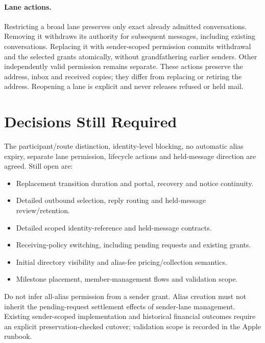 \documentclass[11pt]{article}
\begin{document}
\paragraph{Lane actions.}
Restricting a broad lane preserves only exact already admitted conversations.
Removing it withdraws its authority for subsequent messages, including existing
conversations. Replacing it with sender-scoped permission commits withdrawal and
the selected grants atomically, without grandfathering earlier senders. Other
independently valid permission remains separate. These actions preserve the
address, inbox and received copies; they differ from replacing or retiring the
address. Reopening a lane is explicit and never releases refused or held mail.

\section{Decisions Still Required}

The participant/route distinction, identity-level blocking, no automatic alias
expiry, separate lane permission, lifecycle actions and held-message direction
are agreed. Still open are:
\begin{itemize}
  \item Replacement transition duration and portal, recovery and notice continuity.
  \item Detailed outbound selection, reply routing and held-message review/retention.
  \item Detailed scoped identity-reference and held-message contracts.
  \item Receiving-policy switching, including pending requests and existing grants.
  \item Initial directory visibility and alias-fee pricing/collection semantics.
  \item Milestone placement, member-management flows and validation scope.
\end{itemize}
Do not infer all-alias permission from a sender grant. Alias creation must not
inherit the pending-request settlement effects of sender-lane management. Existing
sender-scoped implementation and historical financial outcomes require an explicit
preservation-checked cutover; validation scope is recorded in the Apple runbook.
\end{document}
